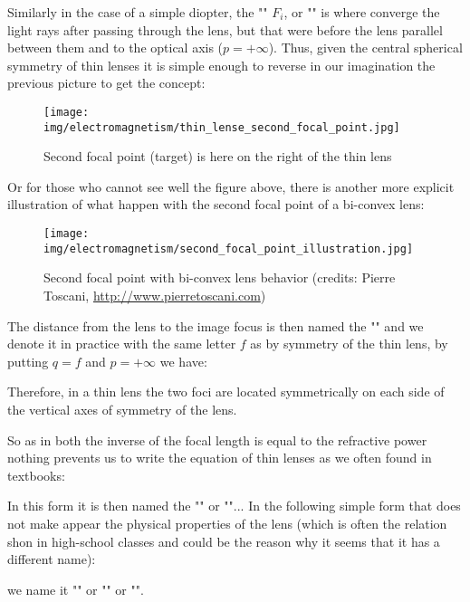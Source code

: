 	Similarly in the case of a simple diopter, the "" $F_i$, or "" is where converge the light rays after passing through the lens, but that were before the lens parallel between them and to the optical axis ($p=+\infty$). Thus, given the central spherical symmetry of thin lenses it is simple enough to reverse in our imagination the previous picture to get the concept:
	\begin{figure}[H]
		\centering
		\texttt{[image: img/electromagnetism/thin\_lense\_second\_focal\_point.jpg]}
		\caption{Second focal point (target) is here on the right of the thin lens}
	\end{figure}
	Or for those who cannot see well the figure above, there is another more explicit illustration of what happen with the second focal point of a bi-convex lens:
	\begin{figure}[H]
		\centering
		\texttt{[image: img/electromagnetism/second\_focal\_point\_illustration.jpg]}
		\caption[Second focal point with bi-convex lens behavior]{Second focal point with bi-convex lens behavior (credits: Pierre Toscani, \url{http://www.pierretoscani.com})}
	\end{figure}
	The distance from the lens to the image focus is then named the "" and we denote it in practice with the same letter $f$ as by symmetry of the thin lens, by putting $q=f$ and $p=+\infty$ we have:
	
	Therefore, in a thin lens the two foci are located symmetrically on each side of the vertical axes of symmetry of the lens.

	So as in both the inverse of the focal length is equal to the refractive power nothing prevents us to write the equation of thin lenses as we often found in textbooks:
	
	In this form it is then named the "" or ""... In the following simple form that does not make appear the physical properties of the lens (which is often the relation shon in high-school classes and could be the reason why it seems that it has a different name):
	
	we name it "" or "" or "".

